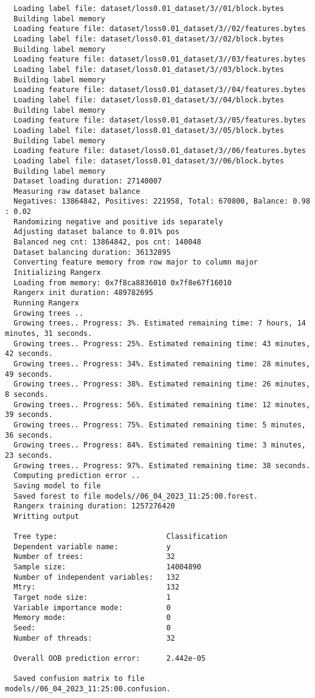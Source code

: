 \documentclass[12pt,oneside]{book}
\begin{document}
\begin{lstlisting}
  Loading label file: dataset/loss0.01_dataset/3//01/block.bytes
  Building label memory
  Loading feature file: dataset/loss0.01_dataset/3//02/features.bytes
  Loading label file: dataset/loss0.01_dataset/3//02/block.bytes
  Building label memory
  Loading feature file: dataset/loss0.01_dataset/3//03/features.bytes
  Loading label file: dataset/loss0.01_dataset/3//03/block.bytes
  Building label memory
  Loading feature file: dataset/loss0.01_dataset/3//04/features.bytes
  Loading label file: dataset/loss0.01_dataset/3//04/block.bytes
  Building label memory
  Loading feature file: dataset/loss0.01_dataset/3//05/features.bytes
  Loading label file: dataset/loss0.01_dataset/3//05/block.bytes
  Building label memory
  Loading feature file: dataset/loss0.01_dataset/3//06/features.bytes
  Loading label file: dataset/loss0.01_dataset/3//06/block.bytes
  Building label memory
  Dataset loading duration: 27140007
  Measuring raw dataset balance
  Negatives: 13864842, Positives: 221958, Total: 670800, Balance: 0.98 : 0.02
  Randomizing negative and positive ids separately
  Adjusting dataset balance to 0.01% pos
  Balanced neg cnt: 13864842, pos cnt: 140048
  Dataset balancing duration: 36132895
  Converting feature memory from row major to column major
  Initializing Rangerx
  Loading from memory: 0x7f8ca8836010 0x7f8e67f16010
  Rangerx init duration: 489782695
  Running Rangerx
  Growing trees ..
  Growing trees.. Progress: 3%. Estimated remaining time: 7 hours, 14 minutes, 31 seconds.
  Growing trees.. Progress: 25%. Estimated remaining time: 43 minutes, 42 seconds.
  Growing trees.. Progress: 34%. Estimated remaining time: 28 minutes, 49 seconds.
  Growing trees.. Progress: 38%. Estimated remaining time: 26 minutes, 8 seconds.
  Growing trees.. Progress: 56%. Estimated remaining time: 12 minutes, 39 seconds.
  Growing trees.. Progress: 75%. Estimated remaining time: 5 minutes, 36 seconds.
  Growing trees.. Progress: 84%. Estimated remaining time: 3 minutes, 23 seconds.
  Growing trees.. Progress: 97%. Estimated remaining time: 38 seconds.
  Computing prediction error ..
  Saving model to file
  Saved forest to file models//06_04_2023_11:25:00.forest.
  Rangerx training duration: 1257276420
  Writting output
  
  Tree type:                         Classification
  Dependent variable name:           y
  Number of trees:                   32
  Sample size:                       14004890
  Number of independent variables:   132
  Mtry:                              132
  Target node size:                  1
  Variable importance mode:          0
  Memory mode:                       0
  Seed:                              0
  Number of threads:                 32
  
  Overall OOB prediction error:      2.442e-05
  
  Saved confusion matrix to file models//06_04_2023_11:25:00.confusion.  
\end{lstlisting}
\end{document}
